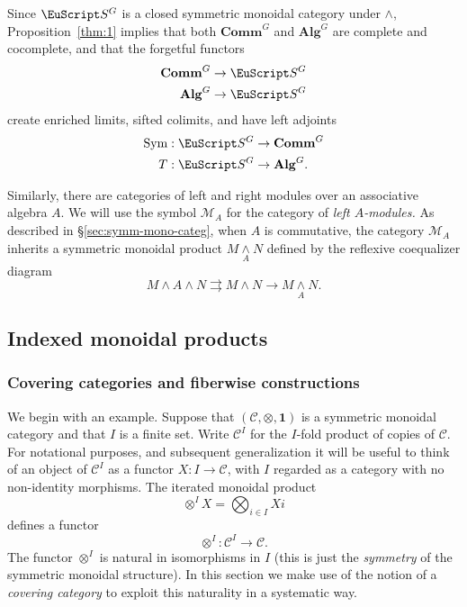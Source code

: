 \documentclass{amsart}
\theoremstyle{definition}
\theoremstyle{remark}
\DeclareMathOperator{\sym}{Sym}
\newcommand{\spectra}{\EuScript S}
\newcommand{\rmod}[1]{\mathcal M_{#1}}
\newcommand{\smashove}[1]{\underset{#1}{\wedge}}
\newcommand{\einftycat}{\mathbf{Comm}}
\newcommand{\ainftycat}{\mathbf{Alg}}
\newcommand{\ugeinftycat}[1]{\einftycat^{#1}}
\newcommand{\ugainftycat}[1]{\ainftycat^{#1}}
\newcommand{\ugspectra}[1]{\spectra^{#1}}
\newcommand{\cat}[1]{{\mathcal #1}}
\newcommand{\one}{\mathbf{1}}
\begin{document}
Since $\ugspectra G$ is a closed symmetric monoidal category under
$\wedge$, Proposition~\ref{thm:1} implies that both $\ugeinftycat{G}$
and $\ugainftycat{G}$ are complete and cocomplete, and that the
forgetful functors
\begin{align*}
\ugeinftycat{G} &\to \ugspectra{G} \\
\ugainftycat{G} &\to \ugspectra{G} 
\end{align*}
create enriched limits, sifted colimits, and have left adjoints
\begin{align*}
\sym :\ugspectra{G} &\to \ugeinftycat{G} \\
T: \ugspectra{G}&\to \ugainftycat{G}.
\end{align*}

Similarly, there are categories of left and right modules over an
associative algebra $A$.  We will use the symbol $\rmod{A}$ for the
category of {\em left $A$-modules.}  As described in
\S\ref{sec:symm-mono-categ}, when $A$ is commutative, the category
$\rmod{A}$ inherits a symmetric monoidal product $M\smashove{A}N$
defined by the reflexive coequalizer diagram
\[
M\wedge A\wedge N \rightrightarrows M\wedge N \rightarrow
M\smashove{A} N.
\]


\subsection{Indexed monoidal products}
\label{sec:index-mono-prod}

\subsubsection{Covering categories and fiberwise constructions}

We begin with an example.  Suppose that $(\cat C,\otimes,
\one)$ is a symmetric monoidal category and that $I$ is a finite set.
Write $\cat C^{I}$ for the $I$-fold product of copies of $\cat C$.  For
notational purposes, and subsequent generalization it will be useful
to think of an object of $\cat C^{I}$ as a functor $X:I\to \cat C$,
with $I$ regarded as a category with no non-identity morphisms.  The
iterated monoidal product
\[
\otimes^{I} X = \bigotimes_{i\in I}Xi
\]
defines a functor 
\[
\otimes^{I}:\cat C^{I}\to \cat C.
\]
The functor $\otimes^{I}$ is natural in isomorphisms in $I$ (this is
just the {\em symmetry} of the symmetric monoidal structure).  In this
section we make use of the notion of a {\em covering category} to
exploit this naturality in a systematic way.
\end{document}
